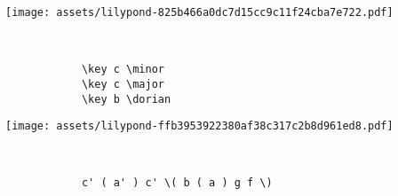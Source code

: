 \documentclass[a4paper]{tufte-handout}
\newenvironment{abjadbookoutput}{}{}
\begin{document}
\begin{description}
\begin{multicols}{2}
            \begin{abjadbookoutput}
            \noindent\texttt{[image: assets/lilypond-825b466a0dc7d15cc9c11f24cba7e722.pdf]}
            \end{abjadbookoutput}

        \end{multicols}

    \item[Key signatures:]
        \hfill \vspace{-\baselineskip} \\
        \begin{multicols}{2}

            \begin{verbatim}
            \key c \minor
            \key c \major
            \key b \dorian
            \end{verbatim}

            \begin{comment}
            <lilypond>[stylesheet=stylesheet-minimal.ily]
            {
                \key c \minor s4
                \key c \major s4
                \key b \dorian s4
            }
            </lilypond>
            \end{comment}

            \begin{abjadbookoutput}
            \noindent\texttt{[image: assets/lilypond-ffb3953922380af38c317c2b8d961ed8.pdf]}
            \end{abjadbookoutput}

        \end{multicols}

    \item[Slurs and phrasing slurs:]
        \hfill \vspace{-\baselineskip} \\
        \begin{multicols}{2}

            \begin{verbatim}
            c' ( a' ) c' \( b ( a ) g f \)
            \end{verbatim}

            \begin{comment}
            <lilypond>[stylesheet=stylesheet-minimal.ily]
            { c' ( a ) c' \( b ( a ) g f \) }
            </lilypond>
            \end{comment}


\end{multicols}
\end{description}
\end{document}
